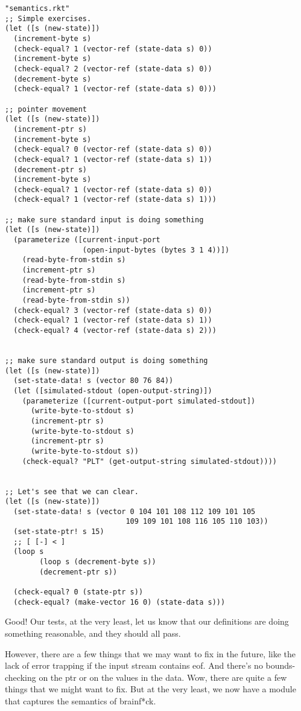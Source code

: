 \documentclass{article}
\begin{document}
\begin{verbatim}
"semantics.rkt"
;; Simple exercises.
(let ([s (new-state)])
  (increment-byte s)
  (check-equal? 1 (vector-ref (state-data s) 0))
  (increment-byte s)
  (check-equal? 2 (vector-ref (state-data s) 0))
  (decrement-byte s)
  (check-equal? 1 (vector-ref (state-data s) 0)))
 
;; pointer movement
(let ([s (new-state)])
  (increment-ptr s)
  (increment-byte s)
  (check-equal? 0 (vector-ref (state-data s) 0))
  (check-equal? 1 (vector-ref (state-data s) 1))
  (decrement-ptr s)
  (increment-byte s)
  (check-equal? 1 (vector-ref (state-data s) 0))
  (check-equal? 1 (vector-ref (state-data s) 1)))
 
;; make sure standard input is doing something
(let ([s (new-state)])
  (parameterize ([current-input-port
                  (open-input-bytes (bytes 3 1 4))])
    (read-byte-from-stdin s)
    (increment-ptr s)
    (read-byte-from-stdin s)
    (increment-ptr s)
    (read-byte-from-stdin s))
  (check-equal? 3 (vector-ref (state-data s) 0))
  (check-equal? 1 (vector-ref (state-data s) 1))
  (check-equal? 4 (vector-ref (state-data s) 2)))
 
 
;; make sure standard output is doing something
(let ([s (new-state)])
  (set-state-data! s (vector 80 76 84))
  (let ([simulated-stdout (open-output-string)])
    (parameterize ([current-output-port simulated-stdout])
      (write-byte-to-stdout s)
      (increment-ptr s)
      (write-byte-to-stdout s)
      (increment-ptr s)
      (write-byte-to-stdout s))
    (check-equal? "PLT" (get-output-string simulated-stdout))))
 
 
;; Let's see that we can clear.
(let ([s (new-state)])
  (set-state-data! s (vector 0 104 101 108 112 109 101 105
                            109 109 101 108 116 105 110 103))
  (set-state-ptr! s 15)
  ;; [ [-] < ]
  (loop s
        (loop s (decrement-byte s))
        (decrement-ptr s))
 
  (check-equal? 0 (state-ptr s))
  (check-equal? (make-vector 16 0) (state-data s)))
\end{verbatim}
Good! Our tests, at the very least, let us know that our definitions are doing something reasonable, and they should all pass.

However, there are a few things that we may want to fix in the future, like the lack of error trapping if the input stream contains eof. And there's no bounds-checking on the ptr or on the values in the data. Wow, there are quite a few things that we might want to fix. But at the very least, we now have a module that captures the semantics of brainf*ck.
\end{document}
